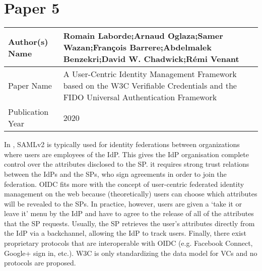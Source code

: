 \section{Paper 5}
    \begin{center}
    \begin{tabular}{ | m{5em} | m{25em} |} 
      \hline
      Author(s) Name & Romain Laborde;Arnaud Oglaza;Samer Wazan;François Barrere;Abdelmalek Benzekri;David W. Chadwick;Rémi Venant \\ 
      \hline
      Paper Name & A User-Centric Identity Management Framework based on the W3C Verifiable Credentials and the FIDO Universal Authentication Framework \\ 
      \hline
      Publication Year & 2020 \\ 
      \hline
    \end{tabular}
    \end{center}
    In \cite{9045440}, SAMLv2 is typically used for identity federations between organizations where users are employees of the IdP. This gives the IdP organisation complete control over the attributes disclosed to the SP. it requires strong trust relations between the IdPs and the SPs, who sign agreements in order to join the federation. OIDC fits more with the concept of user-centric federated identity management on the web because (theoretically) users can choose which attributes will be revealed to the SPs. In practice, however, users are given a `take it or leave it' menu by the IdP and have to agree to the release of all of the attributes that the SP requests. Usually, the SP retrieves the user's attributes directly from the IdP via a backchannel, allowing the IdP to track users. Finally, there exist proprietary protocols that are interoperable with OIDC (e.g. Facebook Connect, Google+ sign in, etc.). W3C is only standardizing the data model for VCs and no protocols are proposed. 
